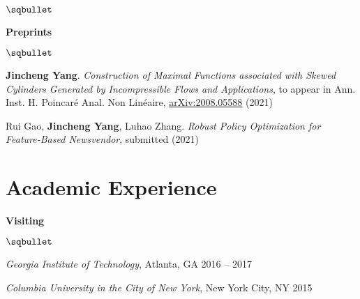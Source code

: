 \documentclass[margin,line]{res}
\newenvironment{list2}{
  \begin{list}{$\sqbullet$}{%
      \setlength{\itemsep}{0.05in}
      \setlength{\parsep}{0in} 
      \setlength{\parskip}{0in}
      \setlength{\topsep}{0.1in} 
      \setlength{\partopsep}{-0.07in} 
      \setlength{\leftmargin}{0.15in}
    }}
{\end{list}}
\begin{document}
\begin{resume}
\begin{list2}
\end{list2}

{\bf Preprints}

\begin{list2}

    \item \textbf{Jincheng Yang}. \textit{Construction of Maximal Functions associated with Skewed Cylinders Generated by Incompressible Flows and Applications}, to appear in 
    Ann. Inst. H. Poincar\'e Anal. Non Lin\'eaire,
    \href{https://arxiv.org/abs/2008.05588}{arXiv:2008.05588} (2021)

    \item Rui Gao, \textbf{Jincheng Yang}, Luhao Zhang. \textit{Robust Policy Optimization for Feature-Based Newsvendor}, submitted (2021) 
    
\end{list2}


% 


\section{\sc Academic Experience}

{\bf Visiting}

\begin{list2}

    \item \textit{Georgia Institute of Technology}, Atlanta, GA \hfill { 2016 -- 2017}
    \item \textit{Columbia University in the City of New York}, New York City, NY \hfill { 2015}


\end{list2}
\end{resume}
\end{document}
